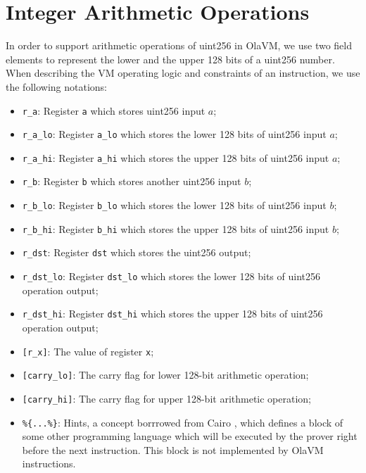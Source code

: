 \section{Integer Arithmetic Operations} \label{sec:integer-arithmetic-operation}

In order to support arithmetic operations of uint256 in OlaVM, we use two field elements to represent the lower and the upper 128 bits of a uint256 number. When describing the VM operating logic and constraints of an instruction, we use the following notations:
\begin{itemize}
    \item \verb|r_a|: Register \verb|a| which stores uint256 input $a$;
    \item \verb|r_a_lo|: Register \verb|a_lo| which stores the lower 128 bits of uint256 input $a$;
    \item \verb|r_a_hi|: Register \verb|a_hi| which stores the upper 128 bits of uint256 input $a$;
    \item \verb|r_b|: Register \verb|b| which stores another uint256 input $b$;
    \item \verb|r_b_lo|: Register \verb|b_lo| which stores the lower 128 bits of uint256 input $b$;
    \item \verb|r_b_hi|: Register \verb|b_hi| which stores the upper 128 bits of uint256 input $b$;
    \item \verb|r_dst|: Register \verb|dst| which stores the uint256 output;
    \item \verb|r_dst_lo|: Register \verb|dst_lo| which stores the lower 128 bits of uint256 operation output;
    \item \verb|r_dst_hi|: Register \verb|dst_hi| which stores the upper 128 bits of uint256 operation output;
    \item \verb|[r_x]|: The value of register \verb|x|;
    \item \verb|[carry_lo]|: The carry flag for lower 128-bit arithmetic operation;
    \item \verb|[carry_hi]|: The carry flag for upper 128-bit arithmetic operation;
    \item \verb|%{...%}|: Hints, a concept borrrowed from Cairo \cite{cryptoeprint:2021/1063}, which defines a block of some other programming language which will be executed by the prover right before the next instruction. This block is not implemented by OlaVM instructions.
\end{itemize}


